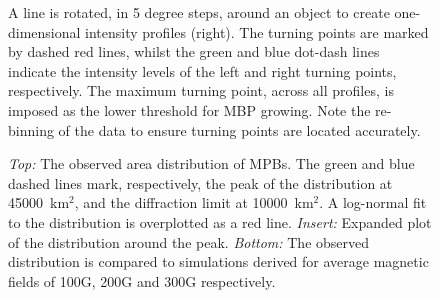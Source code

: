 \documentclass{emulateapj}
\begin{document}
\newpage

\begin{figure}
\begin{minipage}[t]{0.5\linewidth}
\end{minipage}
\hspace{-1.2cm}
\begin{minipage}[t]{0.5\linewidth}
\end{minipage}
\caption{A line is rotated, in 5 degree steps, around an object to create one-dimensional intensity profiles (right). The turning points are marked by dashed red lines, whilst the green and blue dot-dash lines indicate the intensity levels of the left and right turning points, respectively.  The maximum turning point, across all profiles, is imposed as the lower threshold for MBP growing. Note the re-binning of the data to ensure turning points are located accurately.
\label{f3}}
\end{figure}
 
\begin{figure}
\caption{{\it{Top:}} The observed area distribution of MPBs. The green and blue dashed lines mark, respectively, the peak of the distribution at 45000~km$^2$, and the diffraction limit at 10000~km$^2$. A log-normal fit to the distribution is overplotted as a red line. {\it{Insert:}} Expanded plot of the distribution around the peak. {\it{Bottom:}} The observed distribution is compared to simulations derived for average magnetic fields of 100G, 200G and 300G respectively. 
\label{f4}}
\end{figure} 
\end{document}
